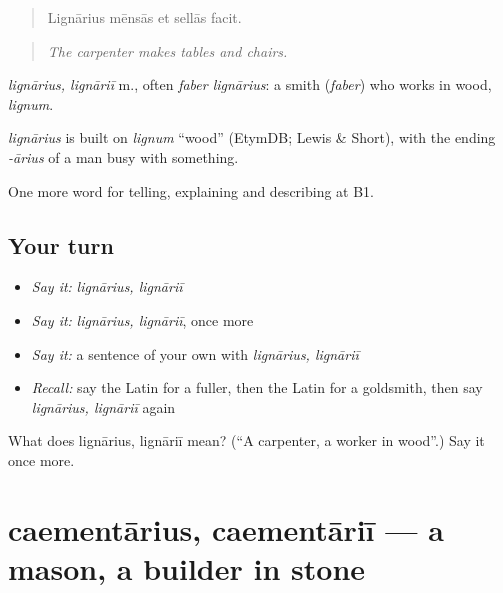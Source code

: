 \begin{quote}
Lignārius mēnsās et sellās facit.
\end{quote}

\begin{quote}
\emph{The carpenter makes tables and chairs.}
\end{quote}

\emph{lignārius, lignāriī} m., often \emph{faber lignārius}: a smith (\emph{faber}) who works in wood, \emph{lignum}.

\begin{cousinweb}
\emph{lignārius} is built on \emph{lignum} \textquotedblleft{}wood\textquotedblright{} (EtymDB; Lewis \& Short), with the ending \emph{-ārius} of a man busy with something.
\end{cousinweb}

\begin{grammarlens}[title={What you've built}]
One more word for telling, explaining and describing at B1.
\end{grammarlens}

\subsection*{Your turn}
\begin{itemize}
\raggedright
  \item \emph{Say it:} \emph{lignārius, lignāriī}
  \item \emph{Say it:} \emph{lignārius, lignāriī}, once more
  \item \emph{Say it:} a sentence of your own with \emph{lignārius, lignāriī}
  \item \emph{Recall:} say the Latin for a fuller, then the Latin for a goldsmith, then say \emph{lignārius, lignāriī} again
\end{itemize}

\begin{tcolorbox}[breakable,colback=teal!4,colframe=teal!35!black,title={Before you move on}]
What does lignārius, lignāriī mean? (\textquotedblleft{}A carpenter, a worker in wood\textquotedblright{}.) Say it once more.
\end{tcolorbox}
\section[caementārius, caementāriī]{caementārius, caementāriī — a mason, a builder in stone}

\label{lesson:LA-C377-caementarius}



